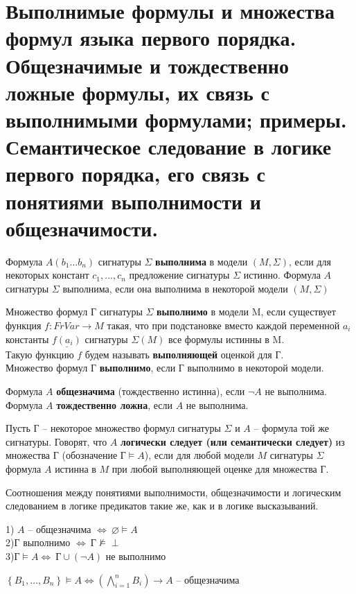 \section{Выполнимые формулы и множества формул языка первого порядка. Общезначимые и тождественно ложные формулы, их связь с выполнимыми формулами; примеры. Семантическое следование в логике первого порядка, его связь с понятиями выполнимости и общезначимости.}
\begin{definition}
	Формула $A(b_1\dots b_n)$ сигнатуры $\Sigma$ \textbf{выполнима} в модели $(M,\Sigma)$, если для некоторых
	констант $c_1,\dots,c_n$ предложение
	сигнатуры $\Sigma$ истинно. Формула $A$ сигнатуры $\Sigma$ выполнима, если она выполнима в некоторой модели
	$(M,\Sigma)$
\end{definition}
\begin{definition}
	Множество формул Г сигнатуры $\Sigma$ \textbf{выполнимо} в модели M, если существует функция $f: FrVar
	\rightarrow M$ такая, что при подстановке вместо каждой переменной $a_i$  константы $\underline{f(a_i)}$
	сигнатуры $\Sigma(M)$ все формулы истинны в M.\\Такую функцию $f$ будем называть \textbf{выполняющей} оценкой
	для Г.\\ Множество формул Г \textbf{выполнимо}, если Г выполнимо в некоторой модели.
\end{definition}
\begin{definition}
    Формула $A$ \textbf{общезначима} (тождественно истинна), если $\neg A$ не выполнима.\\
    Формула $A$ \textbf{тождественно ложна}, если $A$ не выполнима.
\end{definition}
\begin{definition}
	Пусть Г -- некоторое множество формул сигнатуры $\Sigma$ и $A$ -- формула той же сигнатуры. Говорят, что $A$
	\textbf{логически следует (или семантически следует)} из множества Г (обозначение $\text{Г}\vDash A$), если для
	любой модели $M$ сигнатуры $\Sigma$ формула $A$ истинна в $M$ при любой выполняющей оценке для множества Г.
	\label{formula7}
\end{definition}
Соотношения между понятиями выполнимости, общезначимости и логическим следованием в логике предикатов такие же, как
и в логике высказываний.
\begin{proposition}
    1) $A$ -- общезначима $\Longleftrightarrow \: \varnothing \vDash A$\\
    2)Г выполнимо  $\Longleftrightarrow \:\text{Г}\nvDash \perp$\\
    3)$\text{Г} \vDash A \Longleftrightarrow \: \text{Г}\cup (\neg A)$ не выполнимо
\end{proposition}
\begin{proposition}
	$\left\{B_{1}, \ldots, B_{n}\right\} \vDash A \Longleftrightarrow\left(\bigwedge_{i=1}^{n} B_{i}\right)
	\rightarrow A$ -- общезначима
\end{proposition}
